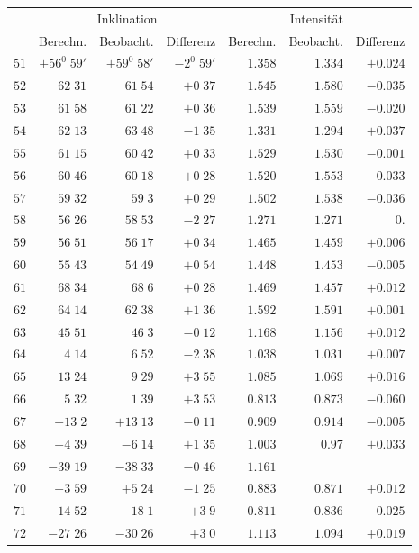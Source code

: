 \clearpage
{}
\begingroup
\fontsize{9}{10.2}\selectfont
\setlength{\tabcolsep}{2.5pt}
\renewcommand{\arraystretch}{1.02}
\begin{center}
\begin{tabular}{r||r|r|r||r|r|r}
\hline
&\multicolumn{3}{c||}{Inklination}&\multicolumn{3}{c}{Intensität}\\
&Berechn.&Beobacht.&Differenz&Berechn.&Beobacht.&Differenz\\\hline
$51$&$+56^0\;59'$&$+59^0\;58'$&$-2^0\;59'$&$1.358$&$1.334$&$+0.024$\\
$52$&$62\;31$&$61\;54$&$+0\;37$&$1.545$&$1.580$&$-0.035$\\
$53$&$61\;58$&$61\;22$&$+0\;36$&$1.539$&$1.559$&$-0.020$\\
$54$&$62\;13$&$63\;48$&$-1\;35$&$1.331$&$1.294$&$+0.037$\\
$55$&$61\;15$&$60\;42$&$+0\;33$&$1.529$&$1.530$&$-0.001$\\
$56$&$60\;46$&$60\;18$&$+0\;28$&$1.520$&$1.553$&$-0.033$\\
$57$&$59\;32$&$59\;3$&$+0\;29$&$1.502$&$1.538$&$-0.036$\\
$58$&$56\;26$&$58\;53$&$-2\;27$&$1.271$&$1.271$&$0.$\\
$59$&$56\;51$&$56\;17$&$+0\;34$&$1.465$&$1.459$&$+0.006$\\
$60$&$55\;43$&$54\;49$&$+0\;54$&$1.448$&$1.453$&$-0.005$\\[2pt]
$61$&$68\;34$&$68\;6$&$+0\;28$&$1.469$&$1.457$&$+0.012$\\
$62$&$64\;14$&$62\;38$&$+1\;36$&$1.592$&$1.591$&$+0.001$\\
$63$&$45\;51$&$46\;3$&$-0\;12$&$1.168$&$1.156$&$+0.012$\\
$64$&$4\;14$&$6\;52$&$-2\;38$&$1.038$&$1.031$&$+0.007$\\
$65$&$13\;24$&$9\;29$&$+3\;55$&$1.085$&$1.069$&$+0.016$\\
$66$&$5\;32$&$1\;39$&$+3\;53$&$0.813$&$0.873$&$-0.060$\\
$67$&$+13\;2$&$+13\;13$&$-0\;11$&$0.909$&$0.914$&$-0.005$\\
$68$&$-4\;39$&$-6\;14$&$+1\;35$&$1.003$&$0.97$&$+0.033$\\
$69$&$-39\;19$&$-38\;33$&$-0\;46$&$1.161$&&\\
$70$&$+3\;59$&$+5\;24$&$-1\;25$&$0.883$&$0.871$&$+0.012$\\[2pt]
$71$&$-14\;52$&$-18\;1$&$+3\;9$&$0.811$&$0.836$&$-0.025$\\
$72$&$-27\;26$&$-30\;26$&$+3\;0$&$1.113$&$1.094$&$+0.019$\\

\end{tabular}
\end{center}
